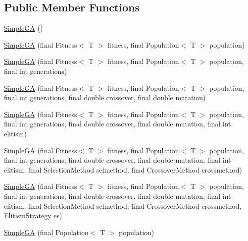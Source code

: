 \subsection*{Public Member Functions}
\begin{DoxyCompactItemize}
\item 
\hyperlink{classjenes_1_1algorithms_1_1_simple_g_a_3_01_t_01extends_01_chromosome_01_4_a706a621e21564095963264fdfd2eba32}{Simple\-G\-A} ()
\item 
\hyperlink{classjenes_1_1algorithms_1_1_simple_g_a_3_01_t_01extends_01_chromosome_01_4_a44ee069daad5aaed809b2d83303052e0}{Simple\-G\-A} (final Fitness$<$ T $>$ fitness, final Population$<$ T $>$ population)
\item 
\hyperlink{classjenes_1_1algorithms_1_1_simple_g_a_3_01_t_01extends_01_chromosome_01_4_acbdaae378fd9263001e6393cb132bda4}{Simple\-G\-A} (final Fitness$<$ T $>$ fitness, final Population$<$ T $>$ population, final int generations)
\item 
\hyperlink{classjenes_1_1algorithms_1_1_simple_g_a_3_01_t_01extends_01_chromosome_01_4_a9382ccbfaed16b3dbf4feeb23afa71e8}{Simple\-G\-A} (final Fitness$<$ T $>$ fitness, final Population$<$ T $>$ population, final int generations, final double crossover, final double mutation)
\item 
\hyperlink{classjenes_1_1algorithms_1_1_simple_g_a_3_01_t_01extends_01_chromosome_01_4_ae4d2d54f7d376688e0ab0eabfa85a7e2}{Simple\-G\-A} (final Fitness$<$ T $>$ fitness, final Population$<$ T $>$ population, final int generations, final double crossover, final double mutation, final int elitism)
\item 
\hyperlink{classjenes_1_1algorithms_1_1_simple_g_a_3_01_t_01extends_01_chromosome_01_4_aeb160f73fc3a8937c7d8da9140f57e38}{Simple\-G\-A} (final Fitness$<$ T $>$ fitness, final Population$<$ T $>$ population, final int generations, final double crossover, final double mutation, final int elitism, final Selection\-Method selmethod, final Crossover\-Method crossmethod)
\item 
\hyperlink{classjenes_1_1algorithms_1_1_simple_g_a_3_01_t_01extends_01_chromosome_01_4_ada2d647b3a202f4e6bb7d1b1c894791b}{Simple\-G\-A} (final Fitness$<$ T $>$ fitness, final Population$<$ T $>$ population, final int generations, final double crossover, final double mutation, final int elitism, final Selection\-Method selmethod, final Crossover\-Method crossmethod, Elitism\-Strategy es)
\item 
\hyperlink{classjenes_1_1algorithms_1_1_simple_g_a_3_01_t_01extends_01_chromosome_01_4_a3f8162d093934286fd3963580f380d9a}{Simple\-G\-A} (final Population$<$ T $>$ population)

\end{DoxyCompactItemize}
